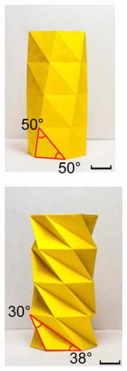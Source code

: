 \begin{figure}
\centering
\begin{minipage}{.5\textwidth}
  \centering
  \includegraphics[width=.4\linewidth]{Figures/HardDeploy.png}
  \label{fig:EDEC}
\end{minipage}%
\begin{minipage}{.5\textwidth}
  \centering
  \includegraphics[width=.4\linewidth]{Figures/EasyDeploy.png}
  \label{fig:HDHC}
\end{minipage}
\end{figure}


